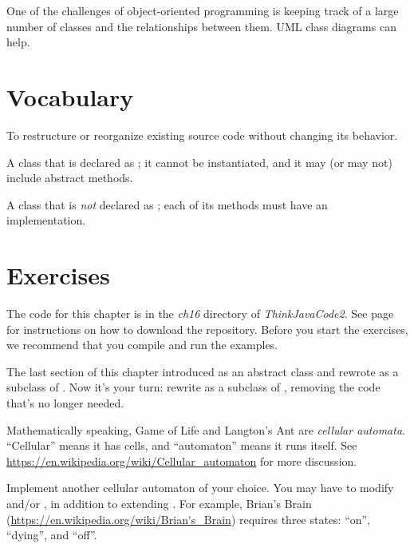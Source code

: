 

One of the challenges of object-oriented programming is keeping track of a large number of classes and the relationships between them.
UML class diagrams can help.


\section{Vocabulary}

\begin{description}

To restructure or reorganize existing source code without changing its behavior.

A class that is declared as ; it cannot be instantiated, and it may (or may not) include abstract methods.

A class that is {\em not} declared as ; each of its methods must have an implementation.

\end{description}


\section{Exercises}

The code for this chapter is in the {\it ch16} directory of {\it ThinkJavaCode2}.
See page~\pageref{code} for instructions on how to download the repository.
Before you start the exercises, we recommend that you compile and run the examples.

\begin{exercise}

The last section of this chapter introduced  as an abstract class and rewrote  as a subclass of .
Now it's your turn: rewrite  as a subclass of , removing the code that's no longer needed.

\end{exercise}


\begin{exercise}

Mathematically speaking, Game of Life and Langton's Ant are {\em cellular automata}.
``Cellular'' means it has cells, and ``automaton'' means it runs itself.
See \url{https://en.wikipedia.org/wiki/Cellular_automaton} for more discussion.

Implement another cellular automaton of your choice.
You may have to modify  and/or , in addition to extending .
For example, Brian's Brain (\url{https://en.wikipedia.org/wiki/Brian's_Brain}) requires three states: ``on'', ``dying'', and ``off''.

\end{exercise}

